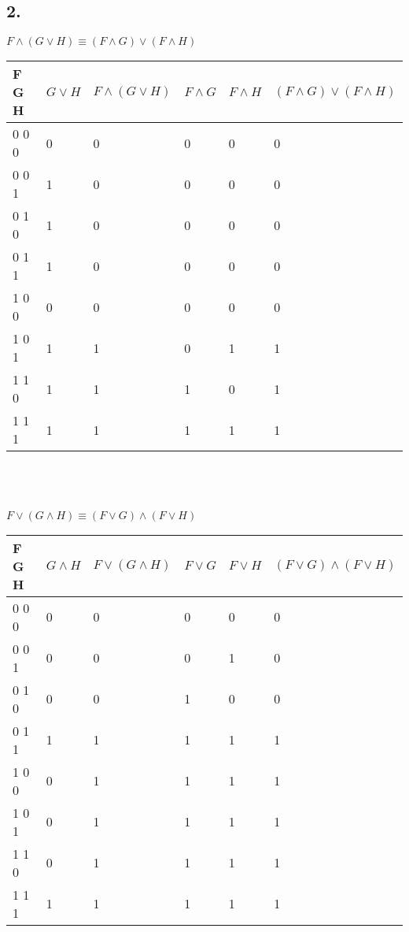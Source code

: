 \documentclass[12pt]{article}
\begin{document}
\subsection*{2.}
$F \land (G \lor H) \equiv (F \land G) \lor (F \land H)$\\
\begin{tabular}{  l | l | l | l | l | l}
	F G H & $G \lor H$ & $F \land (G \lor H) $ & $F \land G$ & $F \land H$ & $(F \land G) \lor (F \land H)$ \\ \hline
	0 0 0 & 0 & 0 & 0 & 0 & 0\\
	0 0 1 & 1 & 0 & 0 & 0 & 0\\
	0 1 0 & 1 & 0 & 0 & 0 & 0\\
	0 1 1 & 1 & 0 & 0 & 0 & 0\\
	1 0 0 & 0 & 0 & 0 & 0 & 0\\
	1 0 1 & 1 & 1 & 0 & 1 & 1\\
	1 1 0 & 1 & 1 & 1 & 0 & 1\\
	1 1 1 & 1 & 1 & 1 & 1 & 1\\
\end{tabular}\\\\\\
$F \lor (G \land H) \equiv (F \lor G) \land (F \lor H)$\\
\begin{tabular}{  l | l | l | l | l | l}
	F G H & $G \land H$ & $F \lor (G \land H) $ & $F \lor G$ & $F \lor H$ & $(F \lor G) \land (F \lor H)$ \\ \hline
	0 0 0 & 0 & 0 & 0 & 0 & 0\\
	0 0 1 & 0 & 0 & 0 & 1 & 0\\
	0 1 0 & 0 & 0 & 1 & 0 & 0\\
	0 1 1 & 1 & 1 & 1 & 1 & 1\\
	1 0 0 & 0 & 1 & 1 & 1 & 1\\
	1 0 1 & 0 & 1 & 1 & 1 & 1\\
	1 1 0 & 0 & 1 & 1 & 1 & 1\\
	1 1 1 & 1 & 1 & 1 & 1 & 1\\
\end{tabular}
\end{document}
